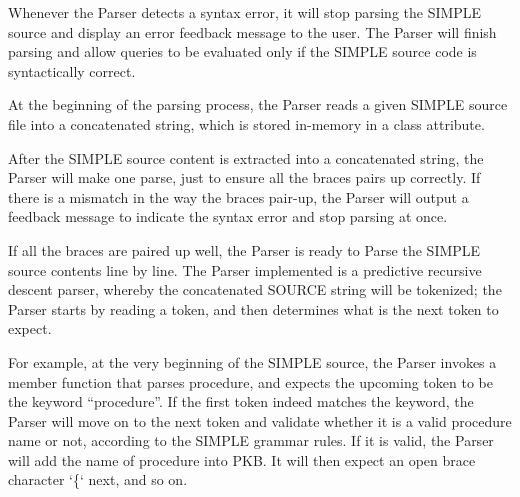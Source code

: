 \documentclass[12pt]{article}
\begin{document}
Whenever the Parser detects a syntax error, it will stop parsing the SIMPLE source and display an error feedback message to the user. The Parser will finish parsing and allow queries to be evaluated only if the SIMPLE source code is syntactically correct.

At the beginning of the parsing process, the Parser reads a given SIMPLE source file into a concatenated string, which is stored in-memory in a class attribute.

After the SIMPLE source content is extracted into a concatenated string, the Parser will make one parse, just to ensure all the braces pairs up correctly. If there is a mismatch in the way the braces pair-up, the Parser will output a feedback message to indicate the syntax error and stop parsing at once.

If all the braces are paired up well, the Parser is ready to Parse the SIMPLE source contents line by line. The Parser implemented is a predictive recursive descent parser, whereby the concatenated SOURCE string will be tokenized; the Parser starts by reading a token, and then determines what is the next token to expect.
\begin{center}
\end{center}
\vspace{6mm}For example, 
at the very beginning of the SIMPLE source,
the Parser invokes a member function that parses procedure,
and expects the upcoming token to be the keyword “procedure”. 
If the first token indeed matches the keyword, 
the Parser will move on to the next token and validate whether
it is a valid procedure name or not, according to the SIMPLE grammar rules. If it is valid,
the Parser will add the name 
of procedure into PKB. It will then expect an open brace character ‘\{‘ next, and so on.
\end{document}

